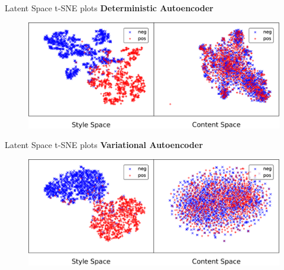 \documentclass[aspectratio=169]{beamer}
\begin{document}
\begin{frame}{Latent Space t-SNE plots}
	\centering
	\textbf{Deterministic Autoencoder}

	\begin{figure}[ht]
		\includegraphics[width=\textwidth]{images/dae-latent-spaces}
	\end{figure}
\end{frame}

\begin{frame}{Latent Space t-SNE plots}
	\centering
	\textbf{Variational Autoencoder}

	\begin{figure}[ht]
		\includegraphics[width=\textwidth]{images/vae-latent-spaces}
	\end{figure}
\end{frame}
\end{document}
